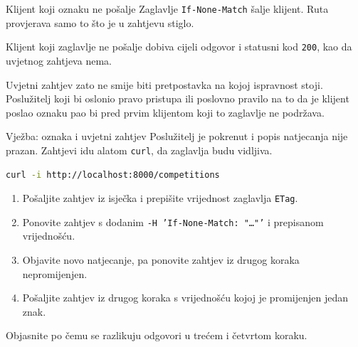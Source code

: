 \begin{frame}{Klijent koji oznaku ne pošalje}
Zaglavlje \texttt{If-None-Match} šalje klijent. Ruta provjerava samo to što je u zahtjevu stiglo.

\vspace{0.9em}
Klijent koji zaglavlje ne pošalje dobiva cijeli odgovor i statusni kod \texttt{200}, kao da uvjetnog zahtjeva nema.

\pause
\vspace{0.9em}
Uvjetni zahtjev zato ne smije biti pretpostavka na kojoj ispravnost stoji. Poslužitelj koji bi oslonio pravo pristupa ili poslovno pravilo na to da je klijent poslao oznaku pao bi pred prvim klijentom koji to zaglavlje ne podržava.
\end{frame}


\begin{frame}[fragile]{Vježba: oznaka i uvjetni zahtjev}
Poslužitelj je pokrenut i popis natjecanja nije prazan. Zahtjevi idu alatom \texttt{curl}, da zaglavlja budu vidljiva.

\begin{lstlisting}[language=bash]
curl -i http://localhost:8000/competitions
\end{lstlisting}

\begin{enumerate}
  \itemsep0.4em
  \item Pošaljite zahtjev iz isječka i prepišite vrijednost zaglavlja \texttt{ETag}.
  \item Ponovite zahtjev s dodanim \texttt{-H 'If-None-Match: "\dots"'} i prepisanom vrijednošću.
  \item Objavite novo natjecanje, pa ponovite zahtjev iz drugog koraka nepromijenjen.
  \item Pošaljite zahtjev iz drugog koraka s vrijednošću kojoj je promijenjen jedan znak.
\end{enumerate}

\vspace{0.6em}
Objasnite po čemu se razlikuju odgovori u trećem i četvrtom koraku.
\end{frame}

